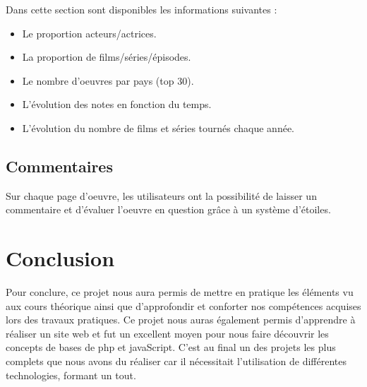 \documentclass[10pt,a4paper]{article}
\begin{document}
Dans cette section sont disponibles les informations suivantes : 
\vskip 3pt
\begin{itemize}
\item Le proportion acteurs/actrices.
\item La proportion de films/séries/épisodes.
\item Le nombre d'oeuvres par pays (top 30).
\item L'évolution des notes en fonction du temps.
\item L'évolution du nombre de films et séries tournés chaque année.
\end{itemize}

\subsection{Commentaires}
Sur chaque page d'oeuvre, les utilisateurs ont la possibilité de laisser un commentaire et d'évaluer l'oeuvre en question grâce à un système d'étoiles.


\section{Conclusion}

Pour conclure, ce projet nous aura permis de mettre en pratique les éléments vu aux cours théorique ainsi que d'approfondir et conforter nos compétences acquises lors des travaux pratiques. Ce projet nous auras également permis d'apprendre à réaliser un site web et fut un excellent moyen pour nous faire découvrir les concepts de bases de php et javaScript. C'est au final un des projets les plus complets que nous avons du réaliser car il nécessitait l'utilisation de différentes technologies, formant un tout. 
\end{document}
